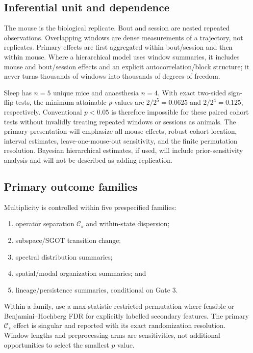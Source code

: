 \documentclass[11pt,a4paper]{article}
\begin{document}
\subsection{Inferential unit and dependence}

The mouse is the biological replicate. Bout and session are nested repeated observations. Overlapping windows are dense measurements of a trajectory, not replicates. Primary effects are first aggregated within bout/session and then within mouse. Where a hierarchical model uses window summaries, it includes mouse and bout/session effects and an explicit autocorrelation/block structure; it never turns thousands of windows into thousands of degrees of freedom.

Sleep has $n=5$ unique mice and anaesthesia $n=4$. With exact two-sided sign-flip tests, the minimum attainable $p$ values are $2/2^5=0.0625$ and $2/2^4=0.125$, respectively. Conventional $p<0.05$ is therefore impossible for these paired cohort tests without invalidly treating repeated windows or sessions as animals. The primary presentation will emphasize all-mouse effects, robust cohort location, interval estimates, leave-one-mouse-out sensitivity, and the finite permutation resolution. Bayesian hierarchical estimates, if used, will include prior-sensitivity analysis and will not be described as adding replication.

\subsection{Primary outcome families}

Multiplicity is controlled within five prespecified families:

\begin{enumerate}
  \item operator separation $\mathcal C_s$ and within-state dispersion;
  \item subspace/SGOT transition change;
  \item spectral distribution summaries;
  \item spatial/modal organization summaries; and
  \item lineage/persistence summaries, conditional on Gate 3.
\end{enumerate}

Within a family, use a max-statistic restricted permutation where feasible or Benjamini--Hochberg FDR for explicitly labelled secondary features. The primary $\mathcal C_s$ effect is singular and reported with its exact randomization resolution. Window lengths and preprocessing arms are sensitivities, not additional opportunities to select the smallest $p$ value.
\end{document}
